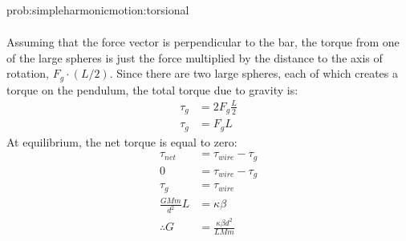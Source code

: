 \begin{solution}{prob:simpleharmonicmotion:torsional}
\begin{enumerate}[(a)]
\begin{align*}
\end{align*}
Assuming that the force vector is perpendicular to the bar, the torque from one of the large spheres is just the force multiplied by the distance to the axis of rotation, $F_g\cdot(L/2)$. Since there are two large spheres, each of which creates a torque on the pendulum, the total torque due to gravity is: 
\begin{align*}
\tau_g&=2F_g\frac{L}{2}\\
\tau_g&=F_gL
\end{align*}
At equilibrium, the net torque is equal to zero:
\begin{align*}
\tau_{net}&=\tau_{wire}-\tau_g\\
0&=\tau_{wire}-\tau_g\\
\tau_g&=\tau_{wire}\\
\frac{GMm}{d^2}L&=\kappa\beta\\
\therefore G&=\frac{\kappa\beta d^2}{LMm}
\end{align*}
\end{enumerate}
\end{solution}




